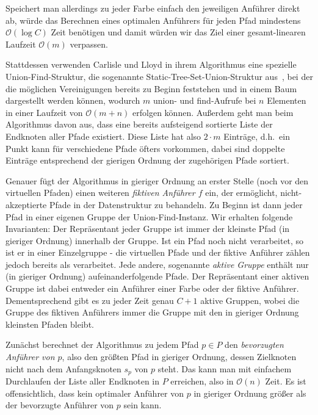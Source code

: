 Speichert man allerdings zu jeder Farbe einfach den jeweiligen Anführer direkt ab, würde das Berechnen eines optimalen
Anführers für jeden Pfad mindestens $\mathcal O(\log C)$ Zeit benötigen und damit würden wir das Ziel einer gesamt-linearen Laufzeit
$\mathcal O(m)$ verpassen.

Stattdessen verwenden Carlisle und Lloyd in ihrem Algorithmus eine spezielle Union-Find-Struktur, die sogenannte
Static-Tree-Set-Union-Struktur aus~\cite{static-tree-set-union}, bei der die möglichen Vereinigungen bereits zu Beginn feststehen und in einem Baum
dargestellt werden können, wodurch $m$ union- und find-Aufrufe bei $n$ Elementen in einer Laufzeit von $\mathcal O(m + n)$ erfolgen können.
Außerdem geht man beim Algorithmus davon aus, dass eine bereits aufsteigend sortierte Liste der Endknoten aller Pfade existiert.
Diese Liste hat also $2\cdot m$ Einträge, d.h.\ ein Punkt kann für verschiedene Pfade öfters vorkommen, dabei sind doppelte Einträge entsprechend der gierigen
Ordnung der zugehörigen Pfade sortiert.

Genauer fügt der Algorithmus in gieriger Ordnung an erster Stelle (noch vor den virtuellen Pfaden) einen weiteren {\em fiktiven Anführer $f$}
ein, der ermöglicht, nicht-akzeptierte Pfade in der Datenstruktur zu behandeln.
Zu Beginn ist dann jeder Pfad in einer eigenen Gruppe der Union-Find-Instanz.
Wir erhalten folgende Invarianten:
Der Repräsentant jeder Gruppe ist immer der kleinste Pfad (in gieriger Ordnung) innerhalb der Gruppe.
Ist ein Pfad noch nicht verarbeitet, so ist er in einer Einzelgruppe - die virtuellen Pfade und der fiktive Anführer
zählen jedoch bereits als verarbeitet.
Jede andere, sogenannte {\em aktive Gruppe} enthält nur (in gieriger Ordnung) aufeinanderfolgende Pfade.
Der Repräsentant einer aktiven Gruppe ist dabei entweder ein Anführer einer Farbe oder der fiktive Anführer.
Dementsprechend gibt es zu jeder Zeit genau $C+1$ aktive Gruppen, wobei die Gruppe des fiktiven
Anführers immer die Gruppe mit den in gieriger Ordnung kleinsten Pfaden bleibt.

Zunächst berechnet der Algorithmus zu jedem Pfad $p \in P$ den {\em bevorzugten Anführer von $p$}, also den größten Pfad
in gieriger Ordnung, dessen Zielknoten nicht nach dem Anfangsknoten $s_p$ von $p$ steht.
Das kann man mit einfachem Durchlaufen der Liste aller Endknoten in $P$ erreichen, also in $\mathcal O(n)$ Zeit.
Es ist offensichtlich, dass kein optimaler Anführer von $p$ in gieriger Ordnung größer als der bevorzugte Anführer von
$p$ sein kann.

